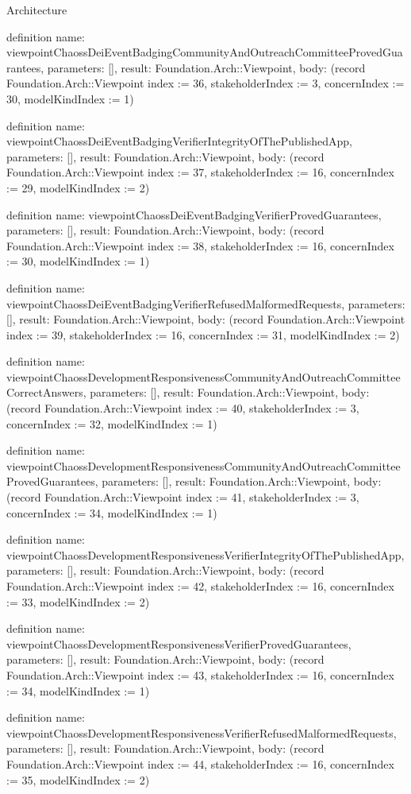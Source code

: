 \begin{lexlean}{Architecture}
\begin{semanticmodule}
definition{
  name: viewpointChaossDeiEventBadgingCommunityAndOutreachCommitteeProvedGuarantees,
  parameters: [],
  result: Foundation.Arch::Viewpoint,
  body: (record Foundation.Arch::Viewpoint {index := 36, stakeholderIndex := 3, concernIndex := 30, modelKindIndex := 1})
}

definition{
  name: viewpointChaossDeiEventBadgingVerifierIntegrityOfThePublishedApp,
  parameters: [],
  result: Foundation.Arch::Viewpoint,
  body: (record Foundation.Arch::Viewpoint {index := 37, stakeholderIndex := 16, concernIndex := 29, modelKindIndex := 2})
}

definition{
  name: viewpointChaossDeiEventBadgingVerifierProvedGuarantees,
  parameters: [],
  result: Foundation.Arch::Viewpoint,
  body: (record Foundation.Arch::Viewpoint {index := 38, stakeholderIndex := 16, concernIndex := 30, modelKindIndex := 1})
}

definition{
  name: viewpointChaossDeiEventBadgingVerifierRefusedMalformedRequests,
  parameters: [],
  result: Foundation.Arch::Viewpoint,
  body: (record Foundation.Arch::Viewpoint {index := 39, stakeholderIndex := 16, concernIndex := 31, modelKindIndex := 2})
}

definition{
  name: viewpointChaossDevelopmentResponsivenessCommunityAndOutreachCommitteeCorrectAnswers,
  parameters: [],
  result: Foundation.Arch::Viewpoint,
  body: (record Foundation.Arch::Viewpoint {index := 40, stakeholderIndex := 3, concernIndex := 32, modelKindIndex := 1})
}

definition{
  name: viewpointChaossDevelopmentResponsivenessCommunityAndOutreachCommitteeProvedGuarantees,
  parameters: [],
  result: Foundation.Arch::Viewpoint,
  body: (record Foundation.Arch::Viewpoint {index := 41, stakeholderIndex := 3, concernIndex := 34, modelKindIndex := 1})
}

definition{
  name: viewpointChaossDevelopmentResponsivenessVerifierIntegrityOfThePublishedApp,
  parameters: [],
  result: Foundation.Arch::Viewpoint,
  body: (record Foundation.Arch::Viewpoint {index := 42, stakeholderIndex := 16, concernIndex := 33, modelKindIndex := 2})
}

definition{
  name: viewpointChaossDevelopmentResponsivenessVerifierProvedGuarantees,
  parameters: [],
  result: Foundation.Arch::Viewpoint,
  body: (record Foundation.Arch::Viewpoint {index := 43, stakeholderIndex := 16, concernIndex := 34, modelKindIndex := 1})
}

definition{
  name: viewpointChaossDevelopmentResponsivenessVerifierRefusedMalformedRequests,
  parameters: [],
  result: Foundation.Arch::Viewpoint,
  body: (record Foundation.Arch::Viewpoint {index := 44, stakeholderIndex := 16, concernIndex := 35, modelKindIndex := 2})
}


\end{semanticmodule}
\end{lexlean}
